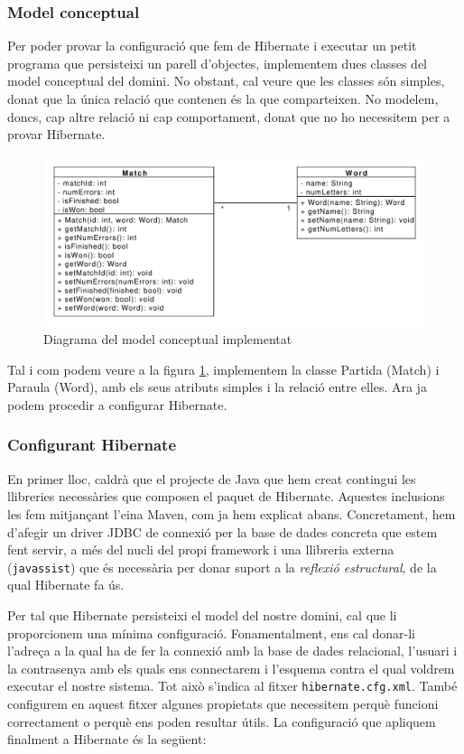\subsubsection{Model conceptual}
Per poder provar la configuració que fem de Hibernate i executar un petit programa que persisteixi un parell d'objectes, implementem dues classes del model conceptual del domini. No obstant, cal veure que les classes són simples, donat que la única relació que contenen és la que comparteixen. No modelem, doncs, cap altre relació ni cap comportament, donat que no ho necessitem per a provar Hibernate.

\begin{figure}[h]
	\centering
	\includegraphics[width=0.8\linewidth]{figures/concept_model_impl.pdf}
	\caption{Diagrama del model conceptual implementat}
	\label{fig:conceptmodel}
\end{figure}

Tal i com podem veure a la figura \ref{fig:conceptmodel}, implementem la classe Partida (Match) i Paraula (Word), amb els seus atributs simples i la relació entre elles. Ara ja podem procedir a configurar Hibernate.

\subsubsection{Configurant Hibernate}
En primer lloc, caldrà que el projecte de Java que hem creat contingui les llibreries necessàries que composen el paquet de Hibernate. Aquestes inclusions les fem mitjançant l'eina Maven, com ja hem explicat abans. Concretament, hem d'afegir un driver JDBC de connexió per la base de dades concreta que estem fent servir, a més del nucli del propi framework i una llibreria externa (\texttt{javassist}) que és necessària per donar suport a la \emph{reflexió estructural}, de la qual Hibernate fa ús.

Per tal que Hibernate persisteixi el model del nostre domini, cal que li proporcionem una mínima configuració. Fonamentalment, ens cal donar-li l'adreça a la qual ha de fer la connexió amb la base de dades relacional, l'usuari i la contrasenya amb els quals ens connectarem i l'esquema contra el qual voldrem executar el nostre sistema. Tot això s'indica al fitxer \texttt{hibernate.cfg.xml}. També configurem en aquest fitxer algunes propietats que necessitem perquè funcioni correctament o perquè ens poden resultar útils. La configuració que apliquem finalment a Hibernate és la següent:


